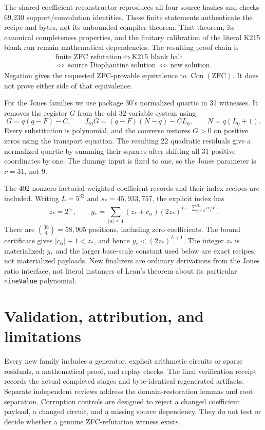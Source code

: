 \documentclass[11pt]{article}
\newcommand{\Con}{\operatorname{Con}}
\begin{document}
The shared coefficient reconstructor reproduces all four source hashes and checks 69,230 support/convolution identities. These finite statements authenticate the recipe and bytes, not its unbounded compiler theorem. That theorem, its canonical completeness properties, and the finitary calibration of the literal K215 blank run remain mathematical dependencies. The resulting proof chain is
\[
\begin{gathered}\text{finite ZFC refutation}\ \Longleftrightarrow\ \text{K215 blank halt}\\
\Longleftrightarrow\ \text{source Diophantine solution}\ \Longleftrightarrow\ \text{new solution}.\end{gathered}
\]
Negation gives the requested ZFC-provable equivalence to $\Con(\mathrm{ZFC})$.
It does not prove either side of that equivalence.

For the Jones families we use package 30's normalized quartic in 31 witnesses. It removes the register $G$ from the old 32-variable system using
\[
 G=q(q-F)-C,\qquad
 L_0G=(q-F)(N-q)-CL_0,\qquad N=q(L_0+1).
\]
Every substitution is polynomial, and the converse restores $G>0$ on positive zeros using the transport equation. The resulting 22 quadratic residuals give a normalized quartic by summing their squares after shifting all 31 positive coordinates by one. The dummy input is fixed to one, so the Jones parameter is $\nu=31$, not 9.

The 402 nonzero factorial-weighted coefficient records and their index recipes are included. Writing $L=5^{32}$ and $s_*=45{,}933{,}757$, the explicit index has
\[
 z_*=2^{s_*},\qquad
 y_*=\sum_{|\alpha|\le4}(z_*+c_\alpha)(2z_*)^{L-\sum_{j=0}^{31}\alpha_j5^j}.
\]
There are $\binom{36}{4}=58{,}905$ positions, including zero coefficients. The bound certificate gives $|c_\alpha|+1<z_*$, and hence
$y_*<(2z_*)^{L+1}$. The integer $z_*$ is materialized; $y_*$ and the larger base-scale constant used below are exact recipes, not materialized payloads. New finalizers are ordinary derivations from the Jones ratio interface, not literal instances of Lean's theorem about its particular \texttt{nineValue} polynomial.






\section{Validation, attribution, and limitations}
Every new family includes a generator, explicit arithmetic circuits or sparse residuals, a mathematical proof, and replay checks. The final verification receipt records the actual completed stages and byte-identical regenerated artifacts. Separate independent reviews address the domain-restoration lemmas and root separation. Corruption controls are designed to reject a changed coefficient payload, a changed circuit, and a missing source dependency. They do not test or decide whether a genuine ZFC-refutation witness exists.
\end{document}
